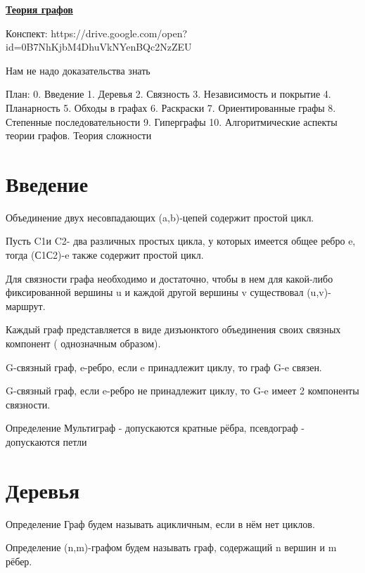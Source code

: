 \documentclass[a4paper,openany]{book}
\newenvironment{definition}
{\begin{statement}{Определение}}
    {\end{statement}}
\begin{document}
\begin{center}
  \LARGE\underline{\textbf{Теория графов}}\\
\end{center}

Конспект:
https://drive.google.com/open?id=0B7NhKjbM4DhuVkNYenBQc2NzZEU

Нам не надо доказательства знать

План:
0. Введение
1. Деревья
2. Связность
3. Независимость и покрытие
4. Планарность
5. Обходы в графах
6. Раскраски
7. Ориентированные графы
8. Степенные последовательности
9. Гиперграфы
10. Алгоритмические аспекты теории графов. Теория сложности



\chapter{Введение}

\begin{stm}
  Объединение двух несовпадающих (a,b)-цепей содержит простой цикл.
\end{stm}
\begin{stm}
  Пусть C1и C2- два различных простых цикла, у которых имеется общее ребро e, тогда (С1С2)-e также содержит простой цикл.
\end{stm}
\begin{stm}
  Для связности графа необходимо и достаточно, чтобы в нем для какой-либо фиксированной вершины u и каждой другой вершины v существовал (u,v)-маршрут.
\end{stm}
\begin{stm}
  Каждый граф представляется в виде дизъюнктого объединения своих связных компонент ( однозначным образом).
\end{stm}
\begin{stm}
  G-связный граф, e-ребро, если e принадлежит циклу, то граф G-e связен.
\end{stm}
\begin{stm}
  G-связный граф, если e-ребро не принадлежит циклу, то G-e имеет 2 компоненты связности.
\end{stm}

\begin{definition}
  Мультиграф - допускаются кратные рёбра, псевдограф - допускаются петли
\end{definition}

\chapter{Деревья}
\begin{definition}
  Граф будем называть ацикличным, если в нём нет циклов.
\end{definition}
\begin{definition}
  (n,m)-графом будем называть граф, содержащий n вершин и m рёбер.
\end{definition}
\end{document}
